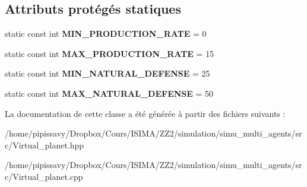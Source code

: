\subsection*{Attributs protégés statiques}
\begin{DoxyCompactItemize}
\item 
\hypertarget{classVirtual__planet_a5c08ee009e9d9d0b284b133e18c2b7f9}{static const int {\bfseries M\-I\-N\-\_\-\-P\-R\-O\-D\-U\-C\-T\-I\-O\-N\-\_\-\-R\-A\-T\-E} = 0}\label{classVirtual__planet_a5c08ee009e9d9d0b284b133e18c2b7f9}

\item 
\hypertarget{classVirtual__planet_a0899115c7ae16c4e07e6319209b678cc}{static const int {\bfseries M\-A\-X\-\_\-\-P\-R\-O\-D\-U\-C\-T\-I\-O\-N\-\_\-\-R\-A\-T\-E} = 15}\label{classVirtual__planet_a0899115c7ae16c4e07e6319209b678cc}

\item 
\hypertarget{classVirtual__planet_ae0e71188803de0af557c7a1db8bd2d95}{static const int {\bfseries M\-I\-N\-\_\-\-N\-A\-T\-U\-R\-A\-L\-\_\-\-D\-E\-F\-E\-N\-S\-E} = 25}\label{classVirtual__planet_ae0e71188803de0af557c7a1db8bd2d95}

\item 
\hypertarget{classVirtual__planet_ad5b8a23606fded6c444a93136fceab0a}{static const int {\bfseries M\-A\-X\-\_\-\-N\-A\-T\-U\-R\-A\-L\-\_\-\-D\-E\-F\-E\-N\-S\-E} = 50}\label{classVirtual__planet_ad5b8a23606fded6c444a93136fceab0a}

\end{DoxyCompactItemize}


La documentation de cette classe a été générée à partir des fichiers suivants \-:\begin{DoxyCompactItemize}
\item 
/home/pipissavy/\-Dropbox/\-Cours/\-I\-S\-I\-M\-A/\-Z\-Z2/simulation/simu\-\_\-multi\-\_\-agents/src/Virtual\-\_\-planet.\-hpp\item 
/home/pipissavy/\-Dropbox/\-Cours/\-I\-S\-I\-M\-A/\-Z\-Z2/simulation/simu\-\_\-multi\-\_\-agents/src/Virtual\-\_\-planet.\-cpp\end{DoxyCompactItemize}
